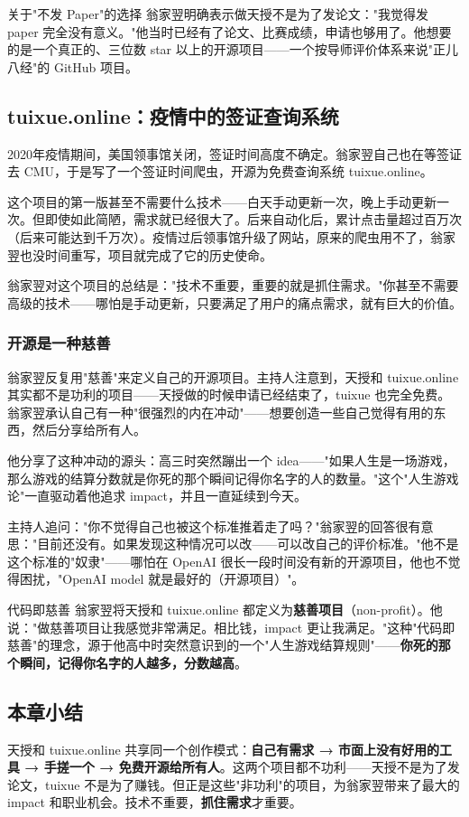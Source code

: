 \begin{warningbox}{关于"不发 Paper"的选择}
翁家翌明确表示做天授不是为了发论文："我觉得发 paper 完全没有意义。"他当时已经有了论文、比赛成绩，申请也够用了。他想要的是一个真正的、三位数 star 以上的开源项目——一个按导师评价体系来说"正儿八经"的 GitHub 项目。
\end{warningbox}

\subsection{tuixue.online：疫情中的签证查询系统}

2020年疫情期间，美国领事馆关闭，签证时间高度不确定。翁家翌自己也在等签证去 CMU，于是写了一个签证时间爬虫，开源为免费查询系统 tuixue.online。

这个项目的第一版甚至不需要什么技术——白天手动更新一次，晚上手动更新一次。但即使如此简陋，需求就已经很大了。后来自动化后，累计点击量超过百万次（后来可能达到千万次）。疫情过后领事馆升级了网站，原来的爬虫用不了，翁家翌也没时间重写，项目就完成了它的历史使命。

翁家翌对这个项目的总结是："技术不重要，重要的就是抓住需求。"你甚至不需要高级的技术——哪怕是手动更新，只要满足了用户的痛点需求，就有巨大的价值。

\subsubsection{开源是一种慈善}

翁家翌反复用"慈善"来定义自己的开源项目。主持人注意到，天授和 tuixue.online 其实都不是功利的项目——天授做的时候申请已经结束了，tuixue 也完全免费。翁家翌承认自己有一种"很强烈的内在冲动"——想要创造一些自己觉得有用的东西，然后分享给所有人。

他分享了这种冲动的源头：高三时突然蹦出一个 idea——"如果人生是一场游戏，那么游戏的结算分数就是你死的那个瞬间记得你名字的人的数量。"这个"人生游戏论"一直驱动着他追求 impact，并且一直延续到今天。

主持人追问："你不觉得自己也被这个标准推着走了吗？"翁家翌的回答很有意思："目前还没有。如果发现这种情况可以改——可以改自己的评价标准。"他不是这个标准的"奴隶"——哪怕在 OpenAI 很长一段时间没有新的开源项目，他也不觉得困扰，"OpenAI model 就是最好的（开源项目）"。

\begin{importantbox}{代码即慈善}
翁家翌将天授和 tuixue.online 都定义为\textbf{慈善项目}（non-profit）。他说："做慈善项目让我感觉非常满足。相比钱，impact 更让我满足。"这种"代码即慈善"的理念，源于他高中时突然意识到的一个"人生游戏结算规则"——\textbf{你死的那个瞬间，记得你名字的人越多，分数越高}。
\end{importantbox}

\subsection{本章小结}

天授和 tuixue.online 共享同一个创作模式：\textbf{自己有需求 → 市面上没有好用的工具 → 手搓一个 → 免费开源给所有人}。这两个项目都不功利——天授不是为了发论文，tuixue 不是为了赚钱。但正是这些"非功利"的项目，为翁家翌带来了最大的 impact 和职业机会。技术不重要，\textbf{抓住需求}才重要。


